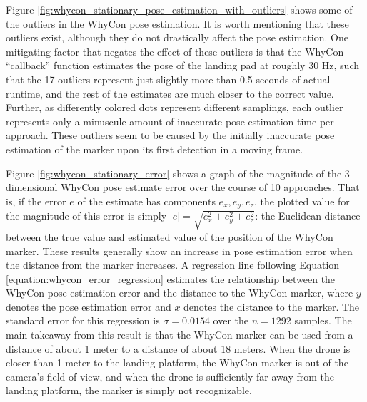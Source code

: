 Figure \ref{fig:whycon_stationary_pose_estimation_with_outliers} shows some of the outliers in the WhyCon pose estimation. It is worth mentioning that these outliers exist, although they do not drastically affect the pose estimation. One mitigating factor that negates the effect of these outliers is that the WhyCon ``callback'' function estimates the pose of the landing pad at roughly 30 Hz, such that the 17 outliers represent just slightly more than 0.5 seconds of actual runtime, and the rest of the estimates are much closer to the correct value. Further, as differently colored dots represent different samplings, each outlier represents only a minuscule amount of inaccurate pose estimation time per approach. These outliers seem to be caused by the initially inaccurate pose estimation of the marker upon its first detection in a moving frame.


Figure \ref{fig:whycon_stationary_error} shows a graph of the magnitude of the 3-dimensional WhyCon pose estimate error over the course of 10 approaches. That is, if the error $e$ of the estimate has components $e_x,e_y,e_z$, the plotted value for the magnitude of this error is simply $|e|=\sqrt{e_x^2+e_y^2+e_z^2}$: the Euclidean distance between the true value and estimated value of the position of the WhyCon marker. These results generally show an increase in pose estimation error when the distance from the marker increases. A regression line following Equation \ref{equation:whycon_error_regression} estimates the relationship between the WhyCon pose estimation error and the distance to the WhyCon marker, where $y$ denotes the pose estimation error and $x$ denotes the distance to the marker. The standard error for this regression is $\sigma=0.0154$ over the $n=1292$ samples. The main takeaway from this result is that the WhyCon marker can be used from a distance of about 1 meter to a distance of about 18 meters. When the drone is closer than 1 meter to the landing platform, the WhyCon marker is out of the camera's field of view, and when the drone is sufficiently far away from the landing platform, the marker is simply not recognizable. 

